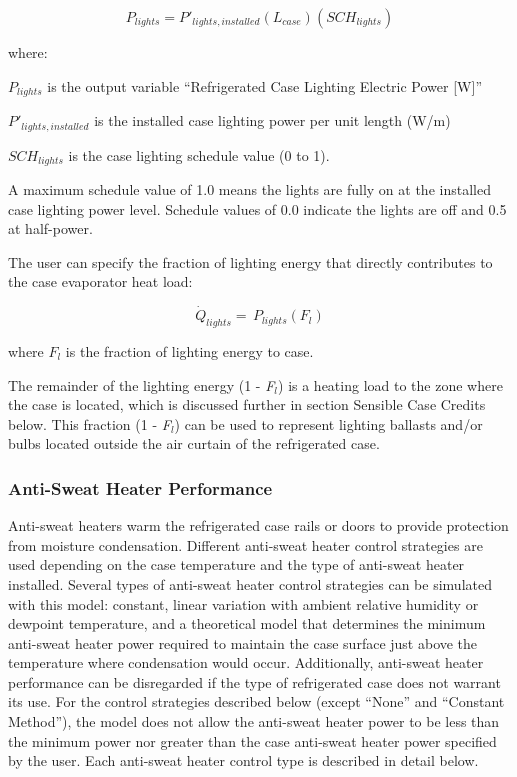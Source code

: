 \begin{equation}
{P_{lights}} = P{'_{lights,installed}}({L_{case}})(SC{H_{lights}})
\end{equation}

where:

\({P_{lights}}\) is the output variable ``Refrigerated Case Lighting Electric Power {[}W{]}''

\(P{'_{lights,installed}}\) is the installed case lighting power per unit length (W/m)

\(SC{H_{lights}}\) is the case lighting schedule value (0 to 1).

A maximum schedule value of 1.0 means the lights are fully on at the installed case lighting power level. Schedule values of 0.0 indicate the lights are off and 0.5 at half-power.

The user can specify the fraction of lighting energy that directly contributes to the case evaporator heat load:

\begin{equation}
{\dot Q_{lights}} = \,{P_{lights}}\left( {{F_l}} \right)
\end{equation}

where \({F_l}\) is the fraction of lighting energy to case.

The remainder of the lighting energy (1 - \emph{F\(_{l}\)}) is a heating load to the zone where the case is located, which is discussed further in section Sensible Case Credits below. This fraction (1 - \emph{F\(_{l}\)}) can be used to represent lighting ballasts and/or bulbs located outside the air curtain of the refrigerated case.

\subsubsection{Anti-Sweat Heater Performance}\label{anti-sweat-heater-performance}

Anti-sweat heaters warm the refrigerated case rails or doors to provide protection from moisture condensation. Different anti-sweat heater control strategies are used depending on the case temperature and the type of anti-sweat heater installed. Several types of anti-sweat heater control strategies can be simulated with this model: constant, linear variation with ambient relative humidity or dewpoint temperature, and a theoretical model that determines the minimum anti-sweat heater power required to maintain the case surface just above the temperature where condensation would occur. Additionally, anti-sweat heater performance can be disregarded if the type of refrigerated case does not warrant its use. For the control strategies described below (except ``None'' and ``Constant Method''), the model does not allow the anti-sweat heater power to be less than the minimum power nor greater than the case anti-sweat heater power specified by the user. Each anti-sweat heater control type is described in detail below.

